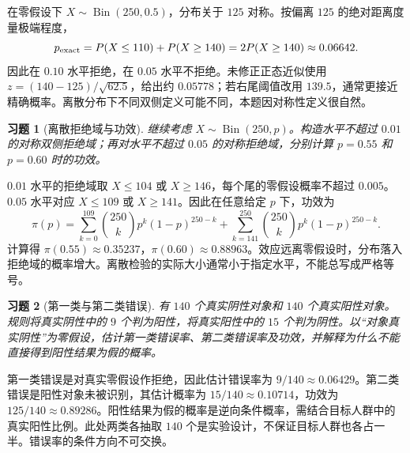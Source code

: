 \documentclass[12pt,fontset=fandol]{ctexart}
\newtheorem{exercise}{习题}[section]
\begin{document}
\begin{solve}\label{a:M-P8-1ab}在零假设下 $X\sim\operatorname{Bin}(250,0.5)$，分布关于 $125$ 对称。按偏离 $125$ 的绝对距离度量极端程度，\[p_{\rm exact}=P(X\le110)+P(X\ge140)=2P(X\ge140)\approx0.06642.\]因此在 $0.10$ 水平拒绝，在 $0.05$ 水平不拒绝。未修正正态近似使用 $z=(140-125)/\sqrt{62.5}$，给出约 $0.05778$；若右尾阈值改用 $139.5$，通常更接近精确概率。离散分布下不同双侧定义可能不同，本题因对称性定义很自然。\end{solve}

\begin{exercise}[离散拒绝域与功效]\label{q:M-P8-1cd}
继续考虑 $X\sim\operatorname{Bin}(250,p)$。构造水平不超过 $0.01$ 的对称双侧拒绝域；再对水平不超过 $0.05$ 的对称拒绝域，分别计算 $p=0.55$ 和 $p=0.60$ 时的功效。\par{}
\end{exercise}

\begin{solve}\label{a:M-P8-1cd}$0.01$ 水平的拒绝域取 $X\le104$ 或 $X\ge146$，每个尾的零假设概率不超过 $0.005$。$0.05$ 水平对应 $X\le109$ 或 $X\ge141$。因此在任意给定 $p$ 下，功效为\[\pi(p)=\sum_{k=0}^{109}\binom{250}{k}p^k(1-p)^{250-k}+\sum_{k=141}^{250}\binom{250}{k}p^k(1-p)^{250-k}.\]计算得 $\pi(0.55)\approx0.35237$，$\pi(0.60)\approx0.88963$。效应远离零假设时，分布落入拒绝域的概率增大。离散检验的实际大小通常小于指定水平，不能总写成严格等号。\end{solve}

\begin{exercise}[第一类与第二类错误]\label{q:M-P8-2}
有 $140$ 个真实阴性对象和 $140$ 个真实阳性对象。规则将真实阴性中的 $9$ 个判为阳性，将真实阳性中的 $15$ 个判为阴性。以“对象真实阴性”为零假设，估计第一类错误率、第二类错误率及功效，并解释为什么不能直接得到阳性结果为假的概率。\par{}
\end{exercise}

\begin{solve}\label{a:M-P8-2}第一类错误是对真实零假设作拒绝，因此估计错误率为 $9/140\approx0.06429$。第二类错误是阳性对象未被识别，其估计概率为 $15/140\approx0.10714$，功效为 $125/140\approx0.89286$。阳性结果为假的概率是逆向条件概率，需结合目标人群中的真实阳性比例。此处两类各抽取 $140$ 个是实验设计，不保证目标人群也各占一半。错误率的条件方向不可交换。\end{solve}
\end{document}
